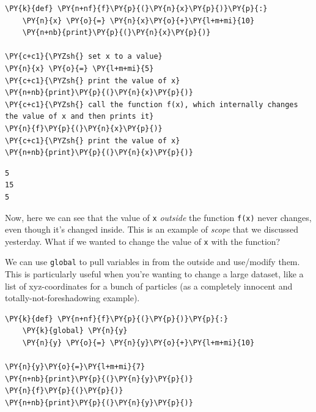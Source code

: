     \begin{tcolorbox}[breakable, size=fbox, boxrule=1pt, pad at break*=1mm,colback=cellbackground, colframe=cellborder]
\begin{Verbatim}[commandchars=\\\{\}]
\PY{k}{def} \PY{n+nf}{f}\PY{p}{(}\PY{n}{x}\PY{p}{)}\PY{p}{:}
    \PY{n}{x} \PY{o}{=} \PY{n}{x}\PY{o}{+}\PY{l+m+mi}{10}
    \PY{n+nb}{print}\PY{p}{(}\PY{n}{x}\PY{p}{)}

\PY{c+c1}{\PYZsh{} set x to a value}
\PY{n}{x} \PY{o}{=} \PY{l+m+mi}{5}
\PY{c+c1}{\PYZsh{} print the value of x}
\PY{n+nb}{print}\PY{p}{(}\PY{n}{x}\PY{p}{)}
\PY{c+c1}{\PYZsh{} call the function f(x), which internally changes the value of x and then prints it}
\PY{n}{f}\PY{p}{(}\PY{n}{x}\PY{p}{)}
\PY{c+c1}{\PYZsh{} print the value of x}
\PY{n+nb}{print}\PY{p}{(}\PY{n}{x}\PY{p}{)}
\end{Verbatim}
\end{tcolorbox}

    \begin{Verbatim}[commandchars=\\\{\}]
5
15
5
    \end{Verbatim}

    Now, here we can see that the value of \texttt{x} \emph{outside} the
function \texttt{f(x)} never changes, even though it's changed inside.
This is an example of \emph{scope} that we discussed yesterday. What if
we wanted to change the value of \texttt{x} with the function?

We can use \texttt{global} to pull variables in from the outside and
use/modify them. This is particularly useful when you're wanting to
change a large dataset, like a list of xyz-coordinates for a bunch of
particles (as a completely innocent and totally-not-foreshadowing
example).

    \begin{tcolorbox}[breakable, size=fbox, boxrule=1pt, pad at break*=1mm,colback=cellbackground, colframe=cellborder]
\begin{Verbatim}[commandchars=\\\{\}]
\PY{k}{def} \PY{n+nf}{f}\PY{p}{(}\PY{p}{)}\PY{p}{:}
    \PY{k}{global} \PY{n}{y}
    \PY{n}{y} \PY{o}{=} \PY{n}{y}\PY{o}{+}\PY{l+m+mi}{10}

\PY{n}{y}\PY{o}{=}\PY{l+m+mi}{7}
\PY{n+nb}{print}\PY{p}{(}\PY{n}{y}\PY{p}{)}
\PY{n}{f}\PY{p}{(}\PY{p}{)}
\PY{n+nb}{print}\PY{p}{(}\PY{n}{y}\PY{p}{)}
\end{Verbatim}
\end{tcolorbox}


